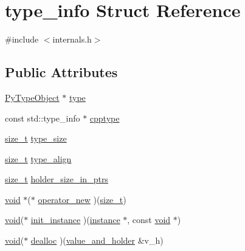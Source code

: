 \hypertarget{structtype__info}{}\section{type\+\_\+info Struct Reference}
\label{structtype__info}


{\ttfamily \#include $<$internals.\+h$>$}

\subsection*{Public Attributes}
\begin{DoxyCompactItemize}
\item 
\mbox{\hyperlink{_python27_2object_8h_a42a55dd6e973872c7a6bc61632070f6f}{Py\+Type\+Object}} $\ast$ \mbox{\hyperlink{structtype__info_a9d303522ded86597dda91813722a39cc}{type}}
\item 
const std\+::type\+\_\+info $\ast$ \mbox{\hyperlink{structtype__info_ae4ae74c1d137f901f75c28e847e157e1}{cpptype}}
\item 
\mbox{\hyperlink{detail_2common_8h_a801d6a451a01953ef8cbae6feb6a3638}{size\+\_\+t}} \mbox{\hyperlink{structtype__info_a5030f67ec35a633be08c1b2dc868975b}{type\+\_\+size}}
\item 
\mbox{\hyperlink{detail_2common_8h_a801d6a451a01953ef8cbae6feb6a3638}{size\+\_\+t}} \mbox{\hyperlink{structtype__info_aacdceab2742cfbc06be7a1be1679ff34}{type\+\_\+align}}
\item 
\mbox{\hyperlink{detail_2common_8h_a801d6a451a01953ef8cbae6feb6a3638}{size\+\_\+t}} \mbox{\hyperlink{structtype__info_a41c3d2416443b60665994a348e556cf8}{holder\+\_\+size\+\_\+in\+\_\+ptrs}}
\item 
\mbox{\hyperlink{_s_d_l__opengles2__gl2ext_8h_ae5d8fa23ad07c48bb609509eae494c95}{void}} $\ast$($\ast$ \mbox{\hyperlink{structtype__info_ad4d8bc132b993129bfdd1556f3c3d001}{operator\+\_\+new}} )(\mbox{\hyperlink{detail_2common_8h_a801d6a451a01953ef8cbae6feb6a3638}{size\+\_\+t}})
\item 
\mbox{\hyperlink{_s_d_l__opengles2__gl2ext_8h_ae5d8fa23ad07c48bb609509eae494c95}{void}}($\ast$ \mbox{\hyperlink{structtype__info_a2670999c513361a3a569238f51ecc450}{init\+\_\+instance}} )(\mbox{\hyperlink{structinstance}{instance}} $\ast$, const \mbox{\hyperlink{_s_d_l__opengles2__gl2ext_8h_ae5d8fa23ad07c48bb609509eae494c95}{void}} $\ast$)
\item 
\mbox{\hyperlink{_s_d_l__opengles2__gl2ext_8h_ae5d8fa23ad07c48bb609509eae494c95}{void}}($\ast$ \mbox{\hyperlink{structtype__info_a79c1cb88eb2e8fdc60d7370eaf2ad0ea}{dealloc}} )(\mbox{\hyperlink{structvalue__and__holder}{value\+\_\+and\+\_\+holder}} \&v\+\_\+h)

\end{DoxyCompactItemize}
